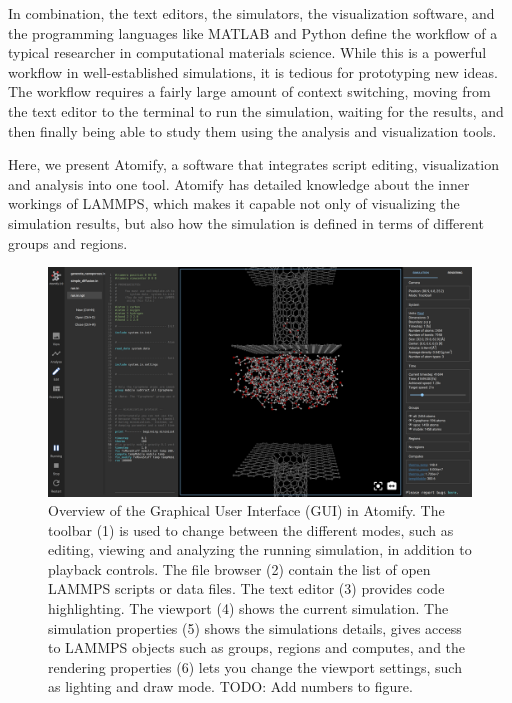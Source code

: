\documentclass[aps,pre,twocolumn,letterpaper,floatfix,nofootinbib]{revtex4}
\begin{document}
In combination, the text editors, the simulators, the visualization software, and the programming
languages like MATLAB and Python define the workflow of a typical researcher in computational
materials science.
While this is a powerful workflow in well-established simulations,
it is tedious for prototyping new ideas.
The workflow requires a fairly large amount of context switching,
moving from the text editor to the terminal to run the simulation,
waiting for the results, and then finally being able to study them using the analysis
and visualization tools.

Here, we present Atomify, a software that integrates script editing,
visualization and analysis into one tool.
Atomify has detailed knowledge about the inner workings of LAMMPS,
which makes it capable not only of visualizing the simulation results,
but also how the simulation is defined in terms of different groups and regions.

\begin{figure}
	\centering
	\includegraphics[width=\textwidth]{gui.png}
	\caption{%
    Overview of the Graphical User Interface (GUI) in Atomify.
    The toolbar (1) is used to change between the different modes, such as
    editing, viewing and analyzing the running simulation,
    in addition to playback controls.
    The file browser (2) contain the list of open LAMMPS scripts or data files.
    The text editor (3) provides code highlighting.
    The viewport (4) shows the current simulation.
    The simulation properties (5) shows the simulations details, gives access to
    LAMMPS objects such as groups, regions and computes, and the rendering
    properties (6) lets you change the viewport settings, such as lighting and
    draw mode.
    TODO: Add numbers to figure.
    }
	\label{fig:gui}
\end{figure}
\end{document}
